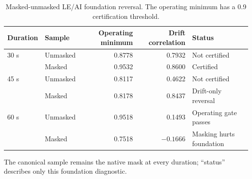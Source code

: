 
\begin{table}[t]
\centering
\caption{Masked-unmasked LE/AI foundation reversal.  The operating minimum
has a 0.9 certification threshold.}
\label{tab:mask_reversal}
\small
\begin{tabular}{llrrl}
\toprule
Duration & Sample & Operating minimum & Drift correlation & Status\\
\midrule
30 s & Unmasked & 0.8778 & 0.7932 & Not certified\\
     & Masked   & 0.9532 & 0.8600 & Certified\\
45 s & Unmasked & 0.8117 & 0.4622 & Not certified\\
     & Masked   & 0.8178 & 0.8437 & Drift-only reversal\\
60 s & Unmasked & 0.9518 & 0.1493 & Operating gate passes\\
     & Masked   & 0.7518 & $-0.1666$ & Masking hurts foundation\\
\bottomrule
\end{tabular}
\begin{minipage}{0.94\linewidth}\footnotesize
The canonical sample remains the native mask at every duration; ``status''
describes only this foundation diagnostic.
\end{minipage}
\end{table}
